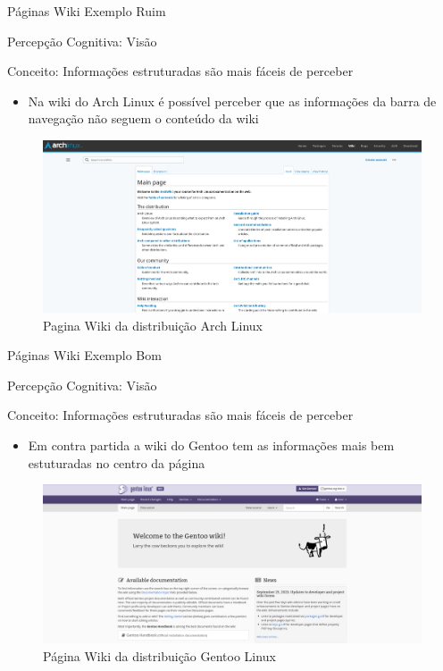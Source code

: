 \documentclass{beamer}
\begin{document}
\begin{frame}{Páginas Wiki Exemplo Ruim}

Percepção Cognitiva: Visão

Conceito: Informações estruturadas são mais fáceis de perceber

\begin{itemize}
    \item Na wiki do Arch Linux é possível perceber que as informações da barra de navegação não seguem o conteúdo da wiki
\end{itemize}
\begin{figure}
    \centering
    \includegraphics[scale=0.15]{images/Arch-wiki.png}
    \caption{Pagina Wiki da distribuição Arch Linux}
\end{figure}
\end{frame}

\begin{frame}{Páginas Wiki Exemplo Bom}

Percepção Cognitiva: Visão

Conceito: Informações estruturadas são mais fáceis de perceber

\begin{itemize}
    \item Em contra partida a wiki do Gentoo tem as informações mais bem estuturadas no centro da página
\end{itemize}
\begin{figure}
    \centering
    \includegraphics[scale=0.2]{images/Gentoo-wiki.png}
    \caption{Página Wiki da distribuição Gentoo Linux}
\end{figure}

\end{frame}
\end{document}
